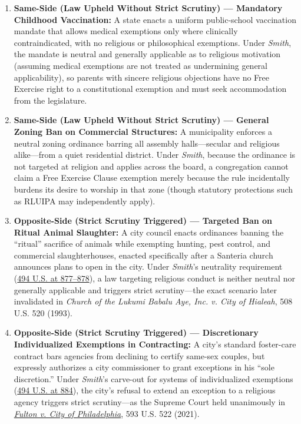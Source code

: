 \documentclass[12pt]{article}
\begin{document}
\begin{enumerate}
  \item \textbf{Same-Side (Law Upheld Without Strict Scrutiny) --- Mandatory Childhood Vaccination:} A state enacts a uniform public-school vaccination mandate that allows medical exemptions only where clinically contraindicated, with no religious or philosophical exemptions. Under \textit{Smith}, the mandate is neutral and generally applicable as to religious motivation (assuming medical exemptions are not treated as undermining general applicability), so parents with sincere religious objections have no Free Exercise right to a constitutional exemption and must seek accommodation from the legislature.
  \item \textbf{Same-Side (Law Upheld Without Strict Scrutiny) --- General Zoning Ban on Commercial Structures:} A municipality enforces a neutral zoning ordinance barring all assembly halls---secular and religious alike---from a quiet residential district. Under \textit{Smith}, because the ordinance is not targeted at religion and applies across the board, a congregation cannot claim a Free Exercise Clause exemption merely because the rule incidentally burdens its desire to worship in that zone (though statutory protections such as RLUIPA may independently apply).
  \item \textbf{Opposite-Side (Strict Scrutiny Triggered) --- Targeted Ban on Ritual Animal Slaughter:} A city council enacts ordinances banning the ``ritual'' sacrifice of animals while exempting hunting, pest control, and commercial slaughterhouses, enacted specifically after a Santeria church announces plans to open in the city. Under \textit{Smith}'s neutrality requirement (\href{https://supreme.justia.com/cases/federal/us/494/872/}{494 U.S. at 877--878}), a law targeting religious conduct is neither neutral nor generally applicable and triggers strict scrutiny---the exact scenario later invalidated in \textit{Church of the Lukumi Babalu Aye, Inc. v. City of Hialeah}, 508 U.S. 520 (1993).
  \item \textbf{Opposite-Side (Strict Scrutiny Triggered) --- Discretionary Individualized Exemptions in Contracting:} A city's standard foster-care contract bars agencies from declining to certify same-sex couples, but expressly authorizes a city commissioner to grant exceptions in his ``sole discretion.'' Under \textit{Smith}'s carve-out for systems of individualized exemptions (\href{https://supreme.justia.com/cases/federal/us/494/872/}{494 U.S. at 884}), the city's refusal to extend an exception to a religious agency triggers strict scrutiny---as the Supreme Court held unanimously in \href{https://www.oyez.org/cases/2020/19-123}{\textit{Fulton v. City of Philadelphia}}, 593 U.S. 522 (2021).

\end{enumerate}
\end{document}

